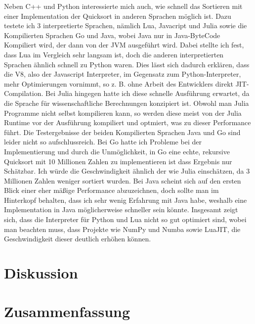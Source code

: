 \documentclass[12pt,a4paper]{article}
\begin{document}
Neben C++ und Python interessierte mich auch, wie schnell das Sortieren mit einer Implementation der Quicksort 
in anderen Sprachen möglich ist. Dazu testete ich 3 interpretierte Sprachen, nämlich Lua, Javacript und Julia sowie die
Kompilierten Sprachen Go und Java, wobei Java nur in Java-ByteCode Kompiliert wird, der dann von der JVM ausgeführt wird.
Dabei stellte ich fest, dass Lua im Vergleich sehr langsam ist, doch die anderen interpretierten Sprachen ähnlich schnell zu Python waren.
Dies lässt sich dadurch erklären, dass die V8, also der Javascript Interpreter, im Gegensatz zum Python-Interpreter,
mehr Optimierungen vornimmt, so z. B. ohne Arbeit des Entwicklers direkt JIT-Compilation. Bei Julia hingegen hatte ich diese
schnelle Ausführung erwartet, da die Sprache für wissenschaftliche Berechnungen konzipiert ist. Obwohl man Julia Programme nicht selbst kompilieren kann,
so werden diese meist von der Julia Runtime vor der Ausführung kompiliert und optmiert, was zu dieser Performance führt.
Die Testergebnisse der beiden Kompilierten Sprachen Java und Go sind leider nicht so aufschlussreich.
Bei Go hatte ich Probleme bei der Implementierung und durch die Unmöglichkeit, in Go eine echte, rekursive Quicksort mit 10 Millionen Zahlen
zu implementieren ist dass Ergebnis nur Schätzbar. Ich würde die Geschwindigkeit ähnlich der wie Julia einschätzen, da 3 Millionen Zahlen weniger sortiert wurden.
Bei Java scheint sich auf den ersten Blick einer eher mäßige Performance abzuzeichnen, doch sollte man im Hinterkopf behalten,
dass ich sehr wenig Erfahrung mit Java habe, weshalb eine Implementation in Java möglicherweise schneller sein könnte.
Insgesamt zeigt sich, dass die Interpreter für Python und Lua nicht so gut optimiert sind, wobei man beachten muss, dass Projekte wie NumPy und Numba sowie LuaJIT,
die Geschwindigkeit dieser deutlich erhöhen können.

\clearpage
\section{Diskussion}
\clearpage
\section{Zusammenfassung}

\clearpage

\printbibliography[title={Literaturverzeichnis}]
\end{document}
